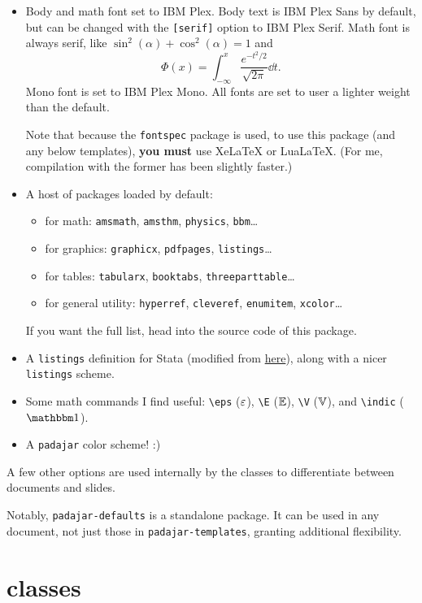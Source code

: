 \documentclass[11pt]{padajar-memo}
\newcommand{\ttslash}[1]{\texttt{\textbackslash #1}}
\begin{document}
\begin{itemize}
	\item Body and math font set to IBM Plex. Body text is IBM Plex Sans by default, but can be changed with the \texttt{[serif]} option to IBM Plex Serif. Math font is always serif, like $\sin^2(\alpha) + \cos^2(\alpha) = 1$ and
	\[
	\Phi(x) = \int_{-\infty}^x \frac{e^{-t^2/2}}{\sqrt{2\pi}} \dd{t}.
	\]
	Mono font is set to IBM Plex Mono. All fonts are set to user a lighter weight than the default.

	Note that because the \texttt{fontspec} package is used, to use this package (and any below templates), \textbf{you must} use XeLaTeX or LuaLaTeX. (For me, compilation with the former has been slightly faster.)
	\item A host of packages loaded by default:
	\begin{itemize}
		\item for math: \texttt{amsmath}, \texttt{amsthm}, \texttt{physics}, \texttt{bbm}\dots
		\item for graphics: \texttt{graphicx}, \texttt{pdfpages}, \texttt{listings}\dots
		\item for tables: \texttt{tabularx}, \texttt{booktabs}, \texttt{threeparttable}\dots
		\item for general utility: \texttt{hyperref}, \texttt{cleveref}, \texttt{enumitem}, \texttt{xcolor}\dots
	\end{itemize}
	If you want the full list, head into the source code of this package.
	\item A \texttt{listings} definition for Stata (modified from \href{https://github.com/satejsoman/stata-lstlisting}{here}), along with a nicer \texttt{listings} scheme.
	\item Some math commands I find useful: \ttslash{eps} ($\varepsilon$), \ttslash{E} ($\mathbb{E}$), \ttslash{V} ($\mathbb{V}$), and \ttslash{indic} ($\indic$).
	\item A \texttt{padajar} color scheme! :)
\end{itemize}

A few other options are used internally by the classes to differentiate between documents and slides.

Notably, \texttt{padajar-defaults} is a standalone package. It can be used in any document, not just those in \texttt{padajar-templates}, granting additional flexibility.

\section{classes}
\end{document}
